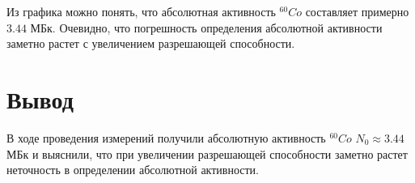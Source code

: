 \documentclass[12pt]{article}
\begin{document}
    Из графика можно понять, что абсолютная активность $^{60}Co$ составляет
    примерно $3.44$ МБк. Очевидно, что погрешность определения абсолютной
    активности заметно растет с увеличением разрешающей способности.

  \section{Вывод}

    В ходе проведения измерений получили абсолютную активность $^{60}Co$
    $N_0 \approx 3.44$ МБк и выяснили, что при увеличении разрешающей способности
    заметно растет неточность в определении абсолютной активности.
\end{document}
